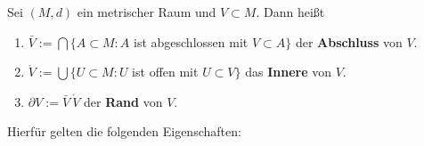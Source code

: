 \begin{definition}
	Sei $(M, d)$ ein metrischer Raum und $V \subset M$. Dann heißt 
	\begin{enumerate}[label=\alph*\upshape)]   
		\item $\bar V := \bigcap \{ A \subset M: A$ ist abgeschlossen mit $V \subset A \} $ der \textbf{Abschluss} von $V$.
		\item $\mathring V := \bigcup \{ U \subset M: U$ ist offen mit $U \subset V \}$ das \textbf{Innere} von $V$. 
		\item $ \partial V := \bar V \ \mathring V$ der \textbf{Rand} von $V$.
	\end{enumerate}
\end{definition}

Hierfür gelten die folgenden Eigenschaften:

